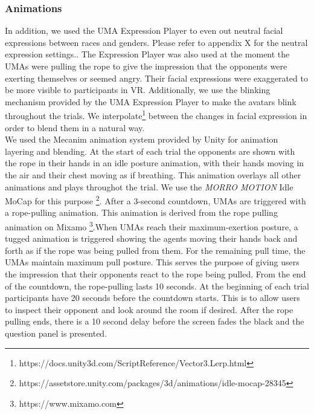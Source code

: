 \subsubsection{Animations}
\label{subsection:animation}
 In addition, we used the UMA Expression Player to even out neutral facial expressions between races and genders. Please refer to appendix X for the neutral expression settings.. The Expression Player was also used at the moment the UMAs were pulling the rope to give the impression that the opponents were exerting themselves or seemed angry. Their facial expressions were exaggerated to be more visible to participants in VR. Additionally, we use the blinking mechanism provided by the UMA Expression Player to make the avatars blink throughout the trials. We interpolate\footnote{https://docs.unity3d.com/ScriptReference/Vector3.Lerp.html} between the changes in facial expression in order to blend them in a natural way.
\\
We used the Mecanim animation system provided by Unity for animation layering and blending. At the start of each trial the opponents are shown with the rope in their hands in an idle posture animation, with their hands moving in the air and their chest moving as if breathing. This animation overlays all other animations and plays throughot the trial. We use the \textit{MORRO MOTION} Idle MoCap for this purpose \footnote{https://assetstore.unity.com/packages/3d/animations/idle-mocap-28345}. After a 3-second countdown, UMAs are triggered with a rope-pulling animation. This animation is derived from the rope pulling animation on Mixamo \footnote{https://www.mixamo.com}.When UMAs reach their maximum-exertion posture,  a tugged animation is triggered showing the agents moving their hands back and forth as if the rope was being pulled from them. For the remaining pull time, the UMAs maintain maximum pull posture. This serves the purpose of giving users the impression that their opponents react to the rope being pulled. From the end of the countdown, the rope-pulling lasts 10 seconds. At the beginning of each trial participants have 20 seconds before the countdown starts. This is to allow users to inspect their opponent and look around the room if desired. After the rope pulling ends, there is a 10 second delay before the screen fades the black and the question panel is presented. 
